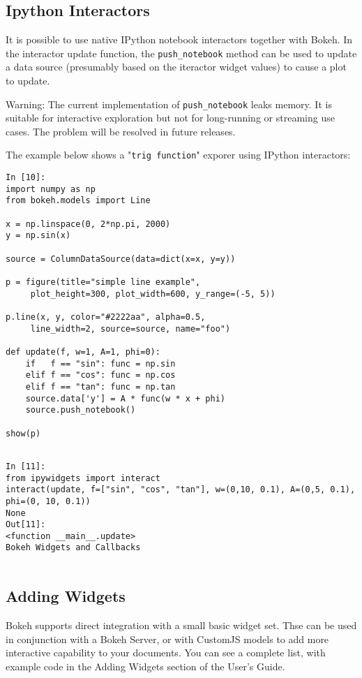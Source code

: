 \documentclass[a4paper,12pt]{article}
\begin{document}
\subsection{Ipython Interactors}
It is possible to use native IPython notebook interactors together with Bokeh. In the interactor update function, the \texttt{push\_notebook} method can be used to update a data source (presumably based on the iteractor widget values) to cause a plot to update.

Warning: The current implementation of \texttt{push\_notebook} leaks memory. It is suitable for interactive exploration but not for long-running or streaming use cases. The problem will be resolved in future releases.

The example below shows a "\texttt{trig function}" exporer using IPython interactors:

\begin{framed}
\begin{verbatim}
In [10]:
import numpy as np
from bokeh.models import Line

x = np.linspace(0, 2*np.pi, 2000)
y = np.sin(x)

source = ColumnDataSource(data=dict(x=x, y=y))

p = figure(title="simple line example", 
     plot_height=300, plot_width=600, y_range=(-5, 5))
     
p.line(x, y, color="#2222aa", alpha=0.5, 
     line_width=2, source=source, name="foo")

def update(f, w=1, A=1, phi=0):
    if   f == "sin": func = np.sin
    elif f == "cos": func = np.cos
    elif f == "tan": func = np.tan
    source.data['y'] = A * func(w * x + phi)
    source.push_notebook()

show(p)
\end{verbatim}
\end{framed}
\begin{framed}
	\begin{verbatim}
	
In [11]:
from ipywidgets import interact
interact(update, f=["sin", "cos", "tan"], w=(0,10, 0.1), A=(0,5, 0.1), phi=(0, 10, 0.1))
None
Out[11]:
<function __main__.update>
Bokeh Widgets and Callbacks
	
\end{verbatim}
\end{framed}

\subsection{Adding Widgets}
Bokeh supports direct integration with a small basic widget set. Thse can be used in conjunction with a Bokeh Server, or with CustomJS models to add more interactive capability to your documents. You can see a complete list, with example code in the Adding Widgets section of the User's Guide.
\end{document}
